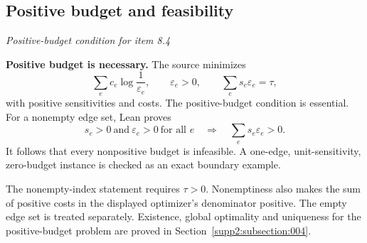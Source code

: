 \subsection{Positive budget and feasibility}\label{supp1:subsection:005}\textit{Positive-budget condition for item 8.4}\par
\textbf{Positive budget is necessary.} The source minimizes
\[
\sum_e c_e\log\frac1{\varepsilon_e},\qquad
\varepsilon_e>0,\qquad \sum_e s_e\varepsilon_e=\tau,
\]
with positive sensitivities and costs. The positive-budget condition is essential. For a nonempty edge set, Lean proves
\[
s_e>0\ \text{and}\ \varepsilon_e>0\ \text{for all }e
\quad\Longrightarrow\quad
\sum_e s_e\varepsilon_e>0.
\]
It follows that every nonpositive budget is infeasible. A one-edge, unit-sensitivity, zero-budget instance is checked as an exact boundary example.

The nonempty-index statement requires $\tau>0$. Nonemptiness also makes the sum of positive costs in the displayed optimizer's denominator positive. The empty edge set is treated separately. Existence, global optimality and uniqueness for the positive-budget problem are proved in Section~\ref{supp2:subsection:004}.


